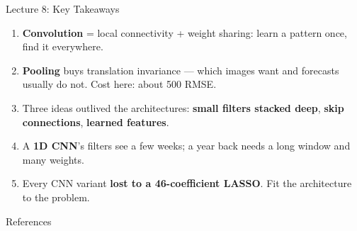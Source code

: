 \documentclass[aspectratio=169, 11pt]{beamer}
\begin{document}
\begin{frame}{Lecture 8: Key Takeaways}
  \begin{keybox}
    {\small
    \begin{enumerate}\itemsep3pt
      \item \textbf{Convolution} = local connectivity + weight sharing: learn a pattern once,
            find it everywhere.
      \item \textbf{Pooling} buys translation invariance --- which images want and forecasts
            usually do not. Cost here: about 500 RMSE.
      \item Three ideas outlived the architectures: \textbf{small filters stacked deep},
            \textbf{skip connections}, \textbf{learned features}.
      \item A \textbf{1D CNN}'s filters see a few weeks; a year back needs a long
            window and many weights.
      \item Every CNN variant \textbf{lost to a 46-coefficient LASSO}. Fit the architecture to
            the problem.
    \end{enumerate}
    }
  \end{keybox}
\end{frame}

\begin{frame}[allowframebreaks]{References}
  \printbibliography[heading=none]
\end{frame}

\end{document}
